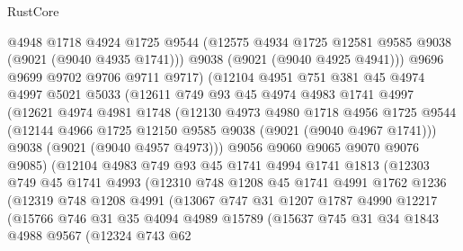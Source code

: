 \begin{lexlean}{RustCore}
\begin{coremodule}
              @4948
              @1718
              @4924
              @1725
              @9544
              (@12575 @4934 @1725 @12581 @9585 @9038 (@9021 (@9040 @4935 @1741)))
              @9038
              (@9021 (@9040 @4925 @4941)))
            @9696
            @9699
            @9702
            @9706
            @9711
            @9717)
          (@12104
            @4951
            @751
            @381
            @45
            @4974
            @4997
            @5021
            @5033
            (@12611
              @749
              @93
              @45
              @4974
              @4983
              @1741
              @4997
              (@12621
                @4974
                @4981
                @1748
                (@12130
                  @4973
                  @4980
                  @1718
                  @4956
                  @1725
                  @9544
                  (@12144 @4966 @1725 @12150 @9585 @9038 (@9021 (@9040 @4967 @1741)))
                  @9038
                  (@9021 (@9040 @4957 @4973)))
                @9056
                @9060
                @9065
                @9070
                @9076
                @9085)
              (@12104
                @4983
                @749
                @93
                @45
                @1741
                @4994
                @1741
                @1813
                (@12303
                  @749
                  @45
                  @1741
                  @4993
                  (@12310
                    @748
                    @1208
                    @45
                    @1741
                    @4991
                    @1762
                    @1236
                    (@12319
                      @748
                      @1208
                      @4991
                      (@13067
                        @747
                        @31
                        @1207
                        @1787
                        @4990
                        @12217
                        (@15766
                          @746
                          @31
                          @35
                          @4094
                          @4989
                          @15789
                          (@15637
                            @745
                            @31
                            @34
                            @1843
                            @4988
                            @9567
                            (@12324
                              @743
                              @62

\end{coremodule}
\end{lexlean}

